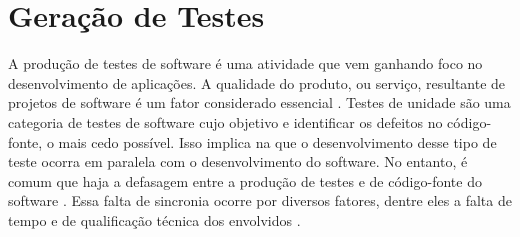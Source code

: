\section{Geração de Testes}
A produção de testes de software é uma atividade que vem ganhando foco no desenvolvimento de aplicações. A qualidade do produto, ou serviço, resultante de projetos de software é um fator considerado essencial \cite{barbosaEtAl2009}. Testes de unidade são uma categoria de testes de software cujo objetivo e identificar os defeitos no código-fonte, o mais cedo possível. Isso implica na que o desenvolvimento desse tipo de teste ocorra em paralela com o desenvolvimento do software. No entanto, é comum que haja a defasagem entre a produção de testes e de código-fonte do software \cite{fantinatoEtAl2004}. Essa falta de sincronia ocorre por diversos fatores, dentre eles a falta de tempo e de qualificação técnica dos envolvidos \cite{fantinatoEtAl2004}.













